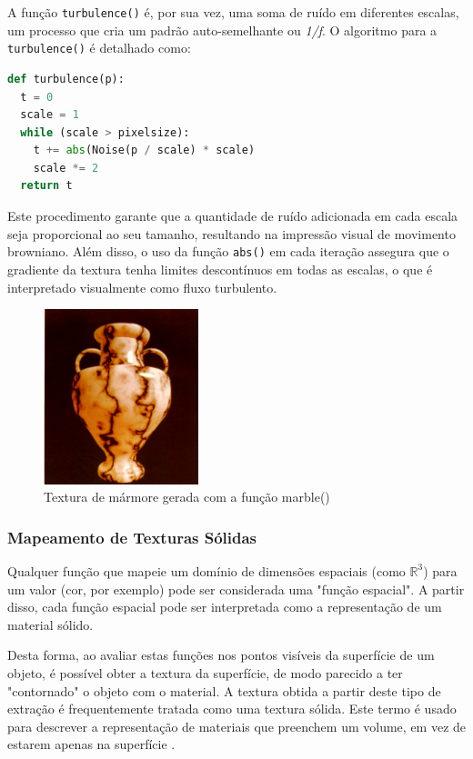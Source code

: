 A função \texttt{turbulence()} é, por sua vez, uma soma de ruído em diferentes escalas, um processo que cria um padrão auto-semelhante ou \textit{1/f}. O algoritmo para a \texttt{turbulence()} é detalhado como:

\begin{lstlisting}[language=Python, caption={Pseudocódigo da função turbulence()}]
def turbulence(p):
  t = 0
  scale = 1
  while (scale > pixelsize):
    t += abs(Noise(p / scale) * scale)
    scale *= 2
  return t
\end{lstlisting}

Este procedimento garante que a quantidade de ruído adicionada em cada escala seja proporcional ao seu tamanho, resultando na impressão visual de movimento browniano. Além disso, o uso da função \texttt{abs()} em cada iteração assegura que o gradiente da textura tenha limites descontínuos em todas as escalas, o que é interpretado visualmente como fluxo turbulento.

\begin{figure}[H]
    \centering
    \includegraphics[width=0.4\textwidth]{img/marble.png}
    \caption{Textura de mármore gerada com a função marble()}
    \label{fig:marble_texture}
\end{figure}


\subsubsection{Mapeamento de Texturas Sólidas}
Qualquer função que mapeie um domínio de dimensões espaciais (como $\mathbb{R}^3$) para um valor (cor, por exemplo) pode ser considerada uma "função espacial". A partir disso, cada função espacial pode ser interpretada como a representação de um material sólido.

Desta forma, ao avaliar estas funções nos pontos visíveis da superfície de um objeto, é possível obter a textura da superfície, de modo parecido a ter "contornado" o objeto com o material. A textura obtida a partir deste tipo de extração é frequentemente tratada como uma textura sólida. Este termo é usado para descrever a representação de materiais que preenchem um volume, em vez de estarem apenas na superfície \cite{fractalNoise}.

